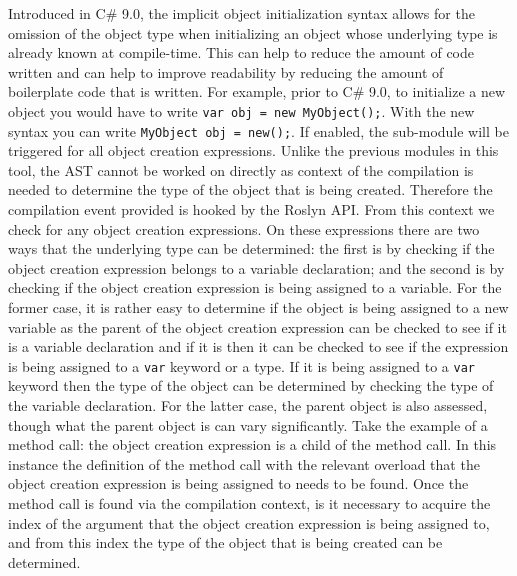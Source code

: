 Introduced in C\# 9.0, the implicit object initialization syntax allows for the omission of the object type when initializing an object whose underlying type is already known at compile-time. This can help to reduce the amount of code written and can help to improve readability by reducing the amount of boilerplate code that is written. For example, prior to C\# 9.0, to initialize a new object you would have to write \texttt{var obj = new MyObject();}. With the new syntax you can write \texttt{MyObject obj = new();}.
If enabled, the sub-module will be triggered for all object creation expressions. Unlike the previous modules in this tool, the AST cannot be worked on directly as context of the compilation is needed to determine the type of the object that is being created. Therefore the compilation event provided is hooked by the Roslyn API. From this context we check for any object creation expressions. On these expressions there are two ways that the underlying type can be determined: the first is by checking if the object creation expression belongs to a variable declaration; and the second is by checking if the object creation expression is being assigned to a variable.
For the former case, it is rather easy to determine if the object is being assigned to a new variable as the parent of the object creation expression can be checked to see if it is a variable declaration and if it is then it can be checked to see if the expression is being assigned to a \texttt{var} keyword or a type. If it is being assigned to a \texttt{var} keyword then the type of the object can be determined by checking the type of the variable declaration. For the latter case, the parent object is also assessed, though what the parent object is can vary significantly. Take the example of a method call: the object creation expression is a child of the method call. In this instance the definition of the method call with the relevant overload that the object creation expression is being assigned to needs to be found. Once the method call is found via the compilation context, is it necessary to acquire the index of the argument that the object creation expression is being assigned to, and from this index the type of the object that is being created can be determined.
